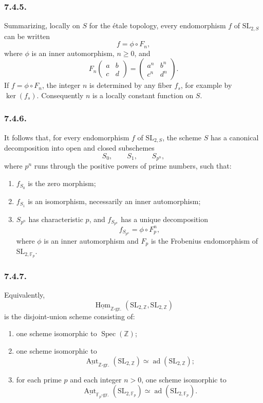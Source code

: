 \subsubsection*{7.4.5.}

Summarizing, locally on \(S\) for the étale topology, every
endomorphism \(f\) of \(\mathrm{SL}_{2,S}\) can be written
\[
  f=\phi\circ F_n,
\]
where \(\phi\) is an inner automorphism, \(n\geq0\), and
\[
  F_n\!\begin{pmatrix}a&b\\c&d\end{pmatrix}
  =
  \begin{pmatrix}a^n&b^n\\c^n&d^n\end{pmatrix}.
\]
If \(f=\phi\circ F_n\), the integer \(n\) is determined by any fiber
\(f_s\), for example by \(\ker(f_s)\). Consequently \(n\) is a
locally constant function on \(S\).

\subsubsection*{7.4.6.}

It follows that, for every endomorphism \(f\) of
\(\mathrm{SL}_{2,S}\), the scheme \(S\) has a canonical decomposition
into open and closed subschemes
\[
  S_0,\qquad S_1,\qquad S_{p^n},
\]
where \(p^n\) runs through the positive powers of prime numbers, such
that:
\begin{enumerate}
\item[(i)] \(f_{S_0}\) is the zero morphism;
\item[(ii)] \(f_{S_1}\) is an isomorphism, necessarily an inner
  automorphism;
\item[(iii)] \(S_{p^n}\) has characteristic \(p\), and
  \(f_{S_{p^n}}\) has a unique decomposition
  \[
    f_{S_{p^n}}=\phi\circ F_p^n,
  \]
  where \(\phi\) is an inner automorphism and \(F_p\) is the Frobenius
  endomorphism of \(\mathrm{SL}_{2,\mathbb F_p}\).
\end{enumerate}

\subsubsection*{7.4.7.}

Equivalently,
\[
  \underline{\operatorname{Hom}}_{\mathbb Z\text{-}\mathrm{gr.}}
    (\mathrm{SL}_{2,\mathbb Z},\mathrm{SL}_{2,\mathbb Z})
\]
is the disjoint-union scheme consisting of:
\begin{enumerate}
\item[(i)] one scheme isomorphic to \(\operatorname{Spec}(\mathbb Z)\);
\item[(ii)] one scheme isomorphic to
  \[
    \underline{\operatorname{Aut}}_{\mathbb Z\text{-}\mathrm{gr.}}
      (\mathrm{SL}_{2,\mathbb Z})
    \simeq
    \operatorname{ad}(\mathrm{SL}_{2,\mathbb Z});
  \]
\item[(iii)] for each prime \(p\) and each integer \(n>0\), one scheme
  isomorphic to
  \[
    \underline{\operatorname{Aut}}_{\mathbb F_p\text{-}\mathrm{gr.}}
      (\mathrm{SL}_{2,\mathbb F_p})
    \simeq
    \operatorname{ad}(\mathrm{SL}_{2,\mathbb F_p}).
  \]
\end{enumerate}

